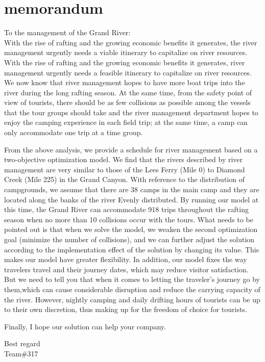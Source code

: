 \newpage
\section{memorandum}
\noindent
To the management of the Grand River:\\
\newline
\noindent
With the rise of rafting and the growing economic benefits it generates, the river management urgently needs a viable itinerary to capitalize on river resources. With the rise of rafting and the growing economic benefits it generates, river management urgently needs a feasible itinerary to capitalize on river resources. We now know that river management hopes to have more boat trips into the river during the long rafting season. At the same time, from the safety point of view of tourists, there should be as few collisions as possible among the vessels that the tour groups should take and the river management department hopes to enjoy the camping experience in each field trip; at the same time, a camp can only accommodate one trip at a time group.
\par From the above analysis, we provide a schedule for river management based on a two-objective optimization model. We find that the rivers described by river management are very similar to those of the Lees Ferry (Mile 0) to Diamond Creek (Mile 225) in the Grand Canyon. With reference to the distribution of campgrounds, we assume that there are 38 camps in the main camp and they are located along the banks of the river Evenly distributed. By running our model at this time, the Grand River can accommodate 918 trips throughout the rafting season when no more than 10 collisions occur with the tours. What needs to be pointed out is that when we solve the model, we weaken the second optimization goal (minimize the number of collisions), and we can further adjust the solution according to the implementation effect of the solution by changing its value. This makes our model have greater flexibility. In addition, our model fixes the way travelers travel and their journey dates, which may reduce visitor satisfaction. But we need to tell you that when it comes to letting the traveler's journey go by them,which can cause considerable disruption and reduce the carrying capacity of the river. However, nightly camping and daily drifting hours of tourists can be up to their own discretion, thus making up for the freedom of choice for tourists.
\par Finally, I hope our solution can help your company.
\begin{flushright}
 	Best regard\\
	Team\#317
\end{flushright}